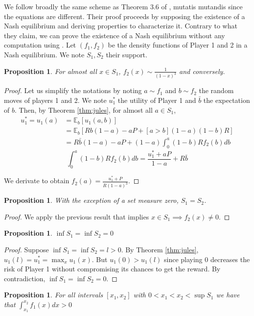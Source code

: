 \documentclass[preprint,12pt,authoryear]{elsarticle}
\newtheorem{proposition}[theorem]{Proposition}
\theoremstyle{definition}
\begin{document}
We follow broadly the same scheme as Theorem 3.6 of \citet{Lotker2008-tx}, mutatis mutandis since the equations are different. Their proof proceeds by supposing the existence of a Nash equilibrium and deriving properties to characterize it. Contrary to what they claim, we can prove the existence of a Nash equilibrium without any computation using \citet{Dasgupta1986-gu}. Let $(f_1, f_2)$ be the density functions of Player 1 and 2 in a Nash equilibrium. We note $S_1, S_2$ their support.
\begin{proposition}
    
For almost all $x \in S_1$, $f_2(x) \sim \frac{1}{(1-x)^3}$ and conversely.
\end{proposition} 
\begin{proof}
Let us simplify the notations by noting $a \sim f_1$ and $b \sim f_2$ the random moves of players 1 and 2.  We note $u_1^*$ the utility of Player 1 and $\bar b$ the expectation of $b$. Then, by Theorem \ref{thm:jules}, for almost all $a\in S_1$,
\begin{align*}u_1^* = u_1(a) &= \mathbb{E}_b[u_1(a, b)]\\
&= \mathbb{E}_b\left[Rb(1-a) - aP  + [a>b](1-a)(1-b)R\right]\\
&= R \bar b (1-a) - a P + (1-a) \int_0^a (1-b) R f_2(b) db\end{align*}
$$\int_0^a (1-b) R f_2(b) db = \frac{u_1^* + aP}{1-a} + R \bar b$$

We derivate to obtain $f_2(a) = \frac{u_1^* + P}{R(1-a)^3} $.
\end{proof}
\begin{proposition}
    With the exception of a set measure zero, $S_1 = S_2$.
\end{proposition} 
\begin{proof}We apply the previous result that implies $x \in S_1 \implies f_2(x) \neq 0$.\end{proof}
\begin{proposition}
    $\inf S_1 = \inf S_2 = 0$
\end{proposition}
\begin{proof}
Suppose $\inf S_1 = \inf S_2 = l > 0$. By Theorem \ref{thm:jules}, $u_1(l) = u_1^* = \max_x u_1(x)$. But $u_1(0) > u_1(l)$ since playing $0$ decreases the risk of Player 1 without compromising its chances to get the reward. By contradiction, $\inf S_1 = \inf S_2 = 0$.
 \end{proof}
\begin{proposition}
For all intervals $[x_1, x_2]$ with $0 < x_1 < x_2 < \sup S_1$ we have that $\int_{x_1}^{x_2} f_1(x) dx > 0$
 \end{proposition}
\end{document}
